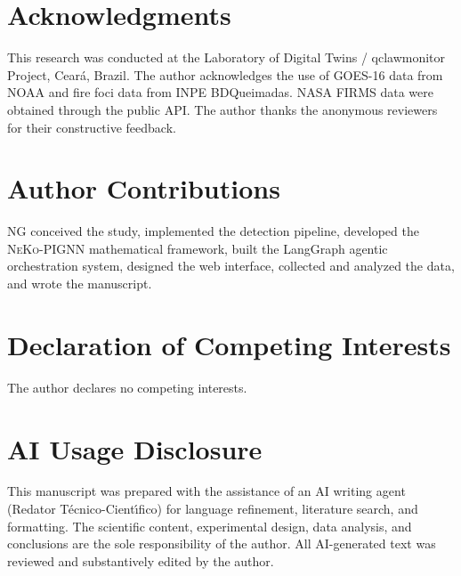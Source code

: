 \documentclass[5p,twocolumn]{elsarticle}
\newcommand{\abbrev}[1]{{\small\textsc{#1}}}
\begin{document}
\section*{Acknowledgments}

This research was conducted at the Laboratory of Digital Twins / qclawmonitor Project, Cear\'{a}, Brazil. The author acknowledges the use of \abbrev{GOES-16} data from \abbrev{NOAA} and fire foci data from \abbrev{INPE} BDQueimadas. \abbrev{NASA} \abbrev{FIRMS} data were obtained through the public \abbrev{API}. The author thanks the anonymous reviewers for their constructive feedback.

\section*{Author Contributions}

\abbrev{NG} conceived the study, implemented the detection pipeline, developed the \abbrev{NeKo-PIGNN} mathematical framework, built the LangGraph agentic orchestration system, designed the web interface, collected and analyzed the data, and wrote the manuscript.

\section*{Declaration of Competing Interests}

The author declares no competing interests.

\section*{AI Usage Disclosure}

This manuscript was prepared with the assistance of an \abbrev{AI} writing agent (Redator T\'ecnico-Cient\'{\i}fico) for language refinement, literature search, and formatting. The scientific content, experimental design, data analysis, and conclusions are the sole responsibility of the author. All \abbrev{AI}-generated text was reviewed and substantively edited by the author.



\end{document}
